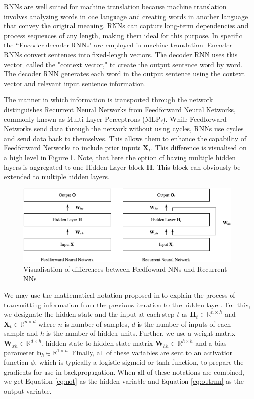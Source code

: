 \documentclass[akbc,twoside,11pt]{article}
\begin{document}
RNNs are well suited for machine translation because machine translation involves analyzing words in one language and creating words in another language that convey the original meaning. RNNs can capture long-term dependencies and process sequences of any length, making them ideal for this purpose. In specific the ``Encoder-decoder RNNs" are employed in machine translation. Encoder RNNs convert sentences into fixed-length vectors. The decoder RNN uses this vector, called the "context vector," to create the output sentence word by word. The decoder RNN generates each word in the output sentence using the context vector and relevant input sentence information.

The manner in which information is transported through the network distinguishes Recurrent Neural Networks from Feedforward Neural Networks, commonly known as Multi-Layer Perceptrons (MLPs). While Feedforward Networks send data through the network without using cycles, RNNs use cycles and send data back to themselves. This allows them to enhance the capability of Feedforward Networks to include prior inputs $\mathbf{X}_t$. This difference is visualised on a high level in Figure \ref{fig:rnn}. Note, that here the option of having multiple hidden layers is aggregated to one Hidden Layer block $\mathbf{H}$. This block can obviously be extended to multiple hidden layers.

\begin{figure}
    \centering
    \includegraphics[width=\textwidth]{assets/rnn-cropped.pdf}
    \caption{Visualisation of differences between Feedfoward NNs und Recurrent NNs~\cite{schmidt2019recurrent}}
    \label{fig:rnn}
\end{figure}

We may use the mathematical notation proposed in \cite{zhang2019dive} to explain the process of transmitting information from the previous iteration to the hidden layer. For this, we designate the hidden state and the input at each step $t$ as $\mathbf{H}_{t} \in \mathbb{R}^{n \times h}$ and $\mathbf{X}_t \in \mathbb{R}^{n \times d}$ where $n$ is number of samples, $d$ is the number of inputs of each sample and $h$ is the number of hidden units. Further, we use a weight matrix $\mathbf{W}_{x h} \in \mathbb{R}^{d \times h}$, hidden-state-to-hidden-state matrix $\mathbf{W}_{h h} \in \mathbb{R}^{h \times h}$ and a bias parameter $\mathbf{b}_{h} \in \mathbb{R}^{1 \times h}$. Finally, all of these variables are sent to an activation function $\phi$, which is typically a logistic sigmoid or tanh function, to prepare the gradients for use in backpropagation. When all of these notations are combined, we get Equation \ref{eq:not} as the hidden variable and Equation \ref{eq:outrnn} as the output variable.
\end{document}
